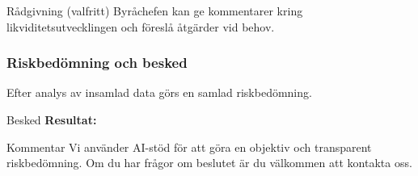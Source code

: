 \documentclass[10pt]{beamer}
\begin{document}
\begin{frame}[label=likviditetsgraf]
  \vspace{0.3cm}
  \begin{block}{Rådgivning (valfritt)}
    Byråchefen kan ge kommentarer kring likviditetsutvecklingen och föreslå åtgärder vid behov.
  \end{block}
  
  \vspace{0.5cm}
  \begin{flushright}
    \hyperlink{nextslide}{}
  \end{flushright}
\end{frame}

\begin{frame}[label=riskbesked]
  \frametitle{Riskbedömning och besked}
  \small
  Efter analys av insamlad data görs en samlad riskbedömning.\\
  \vspace{0.5cm}
  \begin{block}{Besked}
    \textbf{Resultat:} \underline{\hspace{6cm}} \\
  \end{block}
  \vspace{0.5cm}
  \begin{block}{Kommentar}
    Vi använder AI-stöd för att göra en objektiv och transparent riskbedömning. Om du har frågor om beslutet är du välkommen att kontakta oss.
  \end{block}
  \vspace{0.8cm}
  \begin{flushright}
    \hspace{0.5cm}
  \end{flushright}
\end{frame}
\end{document}
